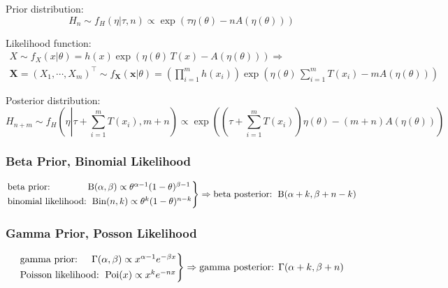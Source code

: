 \documentclass[12pt, twoside, draft]{article}
\begin{document}
Prior distribution:
\begin{equation}
H_n \sim f_H(\eta | \tau, n) \propto \exp(\tau \eta(\theta) - n A(\eta(\theta)))
\end{equation}

Likelihood function:
\begin{multline}
X \sim f_X(x | \theta) = h(x) \exp(\eta(\theta) \, T(x) - A(\eta(\theta))) \Rightarrow \\
\mathbf{X} = (X_1, \cdots, X_m)^\top \sim f_{\mathbf{X}}(\mathbf{x} | \theta) = \left( \prod_{i=1}^m h(x_i) \right) \exp \left(\eta(\theta) \, \sum_{i=1}^m T(x_i) - mA(\eta(\theta)) \right) 
\end{multline}

Posterior distribution:
\begin{equation}
H_{n+m} \sim f_H\left(\eta \left| \tau + \sum_{i=1}^m T(x_i) \right. , m+ n \right) \propto \exp \left( \left(\tau +  \sum_{i=1}^m T(x_i) \right) \eta(\theta) - (m+n) A(\eta(\theta)) \right)
\end{equation}


\subsubsection{Beta Prior, Binomial Likelihood}\label{sec:conjugate_family_beta_binomial}

\begin{equation}
\begin{rcases}
\text{beta prior: } \hspace{35pt}   \operatorname{B}(\alpha, \beta) \propto \theta^{\alpha-1}(1-\theta)^{\beta-1} \\
\text{binomial likelihood: } \operatorname{Bin}(n,k) \propto \theta^k (1-\theta)^{n-k}
\end{rcases} \Rightarrow
\text{beta posterior: } \operatorname{B}(\alpha + k, \beta + n - k)
\end{equation}

\subsubsection{Gamma Prior, Posson Likelihood}\label{sec:conjugate_family_gamma_Poisson}

\begin{equation}
\begin{rcases}
\text{gamma prior: } \hspace{10pt}   \Gamma(\alpha, \beta) \propto x^{\alpha-1}e^{-\beta x} \\
\text{Poisson likelihood: } \operatorname{Poi}(x) \propto x^k e^{-nx}
\end{rcases} \Rightarrow
\text{gamma posterior: } \Gamma(\alpha + k, \beta + n)
\end{equation}
\end{document}
